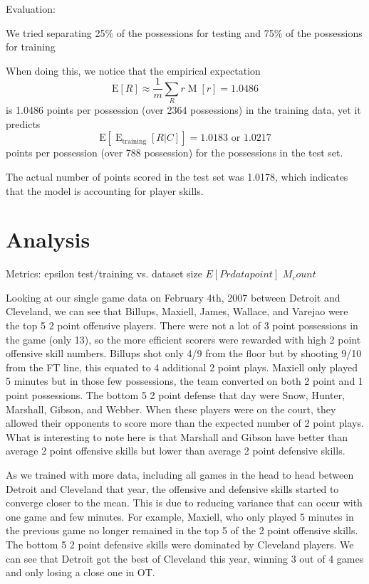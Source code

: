\documentclass[10pt,twocolumn]{article}
\newcommand{\Elin}[1]{\ensuremath{     \mathrm{E}\left[ #1 \right]   }}
\begin{document}
Evaluation:

We tried separating 25\% of the possessions for testing and 75\% of the possessions for training

When doing this, we notice that the empirical expectation
\[
\Elin{R} \approx \frac{1}{m} \sum_{R} r \operatorname{M}\left[ r \right] = 1.0486
\]%
is 1.0486 points per possession (over 2364 possessions) in the training data, yet it predicts
\[
\Elin{\operatorname{E}_{\mathrm{training}}\left[R|C\right]} = 1.0183 \textrm{ or } 1.0217
\]%
points per possession (over 788 possession) for the possessions in the test set.

The actual number of points scored in the test set was 1.0178, which indicates that the model is accounting for player skills.





\section{Analysis}

Metrics:
epsilon
test/training vs. dataset size
$E[Pr{datapoint}]$
$M_count$


Looking at our single game data on February 4th, 2007 between Detroit and Cleveland, we can see that Billups, Maxiell, James, Wallace, and Varejao were the top 5 2 point offensive players. There were not a lot of 3 point possessions in the game (only 13), so the more efficient scorers were rewarded with high 2 point offensive skill numbers. Billups shot only 4/9 from the floor but by shooting 9/10 from the FT line, this equated to 4 additional 2 point plays. Maxiell only played 5 minutes but in those few possessions, the team converted on both 2 point and 1 point possessions. The bottom 5 2 point defense that day were Snow, Hunter, Marshall, Gibson, and Webber. When these players were on the court, they allowed their opponents to score more than the expected number of 2 point plays. What is interesting to note here is that Marshall and Gibson have better than average 2 point offensive skills but lower than average 2 point defensive skills. 

As we trained with more data, including all games in the head to head between Detroit and Cleveland that year, the offensive and defensive skills started to converge closer to the mean. This is due to reducing variance that can occur with one game and few minutes. For example, Maxiell, who only played 5 minutes in the previous game no longer remained in the top 5 of the 2 point offensive skills. The bottom 5 2 point defensive skills were dominated by Cleveland players. We can see that Detroit got the best of Cleveland this year, winning 3 out of 4 games and only losing a close one in OT.
\end{document}
